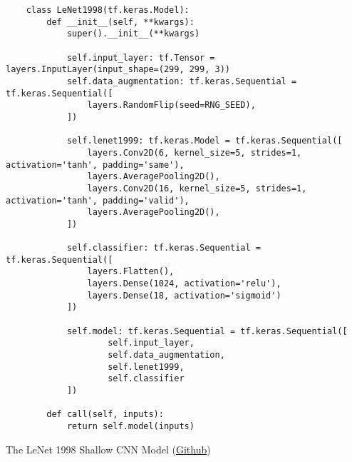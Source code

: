 \begin{listing}[H]
    \begin{verbatim}
    class LeNet1998(tf.keras.Model):
        def __init__(self, **kwargs):
            super().__init__(**kwargs)

            self.input_layer: tf.Tensor = layers.InputLayer(input_shape=(299, 299, 3))
            self.data_augmentation: tf.keras.Sequential = tf.keras.Sequential([
                layers.RandomFlip(seed=RNG_SEED),
            ])

            self.lenet1999: tf.keras.Model = tf.keras.Sequential([
                layers.Conv2D(6, kernel_size=5, strides=1,  activation='tanh', padding='same'),
                layers.AveragePooling2D(),
                layers.Conv2D(16, kernel_size=5, strides=1, activation='tanh', padding='valid'),
                layers.AveragePooling2D(),
            ])

            self.classifier: tf.keras.Sequential = tf.keras.Sequential([
                layers.Flatten(),
                layers.Dense(1024, activation='relu'),
                layers.Dense(18, activation='sigmoid')
            ])

            self.model: tf.keras.Sequential = tf.keras.Sequential([
                    self.input_layer,
                    self.data_augmentation,
                    self.lenet1999,
                    self.classifier
            ])

        def call(self, inputs):
            return self.model(inputs)
    \end{verbatim}
\caption{The LeNet 1998 Shallow CNN Model (\href{https://github.com/ShenZhouHong/radiography-ai-project/blob/cf8c9e9a1f07849787a98b2fc51df690354bf194/python/initial-evaluation/lenet1998.ipynb}{Github})}\label{listing:lenet1998}
\end{listing}